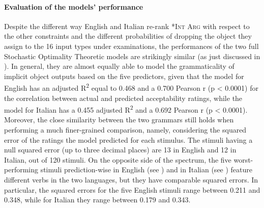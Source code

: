 \paragraph{Evaluation of the models' performance}
Despite the different way English and Italian re-rank \textsc{*Int Arg} with respect to the other constraints and the different probabilities of dropping the object they assign to the 16 input types under examinations, the performances of the two full Stochastic Optimality Theoretic models are strikingly similar (as just discussed in ). In general, they are almost equally able to model the grammaticality of implicit object outputs based on the five predictors, given that the model for English has an adjusted R\textsuperscript{2} equal to 0.468 and a 0.700 Pearson r (p < 0.0001) for the correlation between actual and predicted acceptability ratings, while the model for Italian has a 0.455 adjusted R\textsuperscript{2} and a 0.692 Pearson r (p < 0.0001).\\
Moreover, the close similarity between the two grammars still holds when performing a much finer-grained comparison, namely, considering the squared error of the ratings the model predicted for each stimulus. The stimuli having a null squared error (up to three decimal places) are 13 in English and 12 in Italian, out of 120 stimuli. On the opposite side of the spectrum, the five worst-performing stimuli prediction-wise in English (see ) and in Italian (see ) feature different verbs in the two languages, but they have comparable squared errors. In particular, the squared errors for the five English stimuli range between 0.211 and 0.348, while for Italian they range between 0.179 and 0.343.\\
